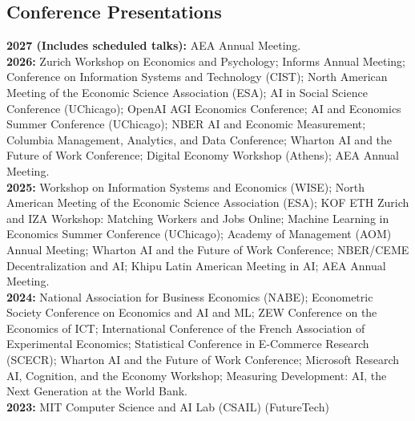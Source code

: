 \documentclass[margin,line,pifont,palatino,courier, 9pt]{res}
\begin{document}
\begin{resume}
\section{\sc Conference Presentations}
\textbf{2027 (Includes scheduled talks):}
AEA Annual Meeting.\vspace{2mm}\\
\textbf{2026:}
Zurich Workshop on Economics and Psychology;
Informs Annual Meeting;
Conference on Information Systems and Technology (CIST);
North American Meeting of the Economic Science Association (ESA);
AI in Social Science Conference (UChicago);
OpenAI AGI Economics Conference;
AI and Economics Summer Conference (UChicago);
NBER AI and Economic Measurement;
Columbia Management, Analytics, and Data Conference;
Wharton AI and the Future of Work Conference;
Digital Economy Workshop (Athens);
AEA Annual Meeting.\vspace{2mm}\\
\textbf{2025:} 
Workshop on Information Systems and Economics (WISE);
North American Meeting of the Economic Science Association (ESA);
KOF ETH Zurich and IZA Workshop: Matching Workers and Jobs Online;
Machine Learning in Economics Summer Conference (UChicago);
Academy of Management (AOM) Annual Meeting;
Wharton AI and the Future of Work Conference;
NBER/CEME Decentralization and AI;
Khipu Latin American Meeting in AI;
AEA Annual Meeting.\vspace{2mm}\\
\textbf{2024:}
National Association for Business Economics (NABE);
Econometric Society Conference on Economics and AI and ML; 
ZEW Conference on the Economics of ICT;
International Conference of the French Association of Experimental Economics;
Statistical Conference in E-Commerce Research (SCECR);
Wharton AI and the Future of Work Conference; 
Microsoft Research AI, Cognition, and the Economy Workshop; 
Measuring Development: AI, the Next Generation at the World Bank. 
\vspace{2mm}\\
\textbf{2023:} MIT Computer Science and AI Lab (CSAIL) (FutureTech)




\end{resume}
\end{document}
